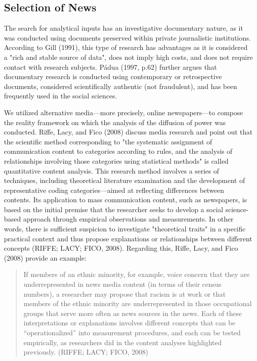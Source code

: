 \subsection{Selection of News}

The search for analytical inputs has an investigative documentary nature, as it was conducted using documents preserved within private journalistic institutions. According to Gill (1991), this type of research has advantages as it is considered a "rich and stable source of data", does not imply high costs, and does not require contact with research subjects. Pádua (1997, p.62) further argues that documentary research is conducted using contemporary or retrospective documents, considered scientifically authentic (not fraudulent), and has been frequently used in the social sciences.

We utilized alternative media—more precisely, online newspapers—to compose the reality framework on which the analysis of the diffusion of power was conducted. Riffe, Lacy, and Fico (2008) discuss media research and point out that the scientific method corresponding to "the systematic assignment of communication content to categories according to rules, and the analysis of relationships involving those categories using statistical methods" is called quantitative content analysis. This research method involves a series of techniques, including theoretical literature examination and the development of representative coding categories—aimed at reflecting differences between contents. Its application to mass communication content, such as newspapers, is based on the initial premise that the researcher seeks to develop a social science-based approach through empirical observations and measurements. In other words, there is sufficient suspicion to investigate "theoretical traits" in a specific practical context and thus propose explanations or relationships between different concepts (RIFFE; LACY; FICO, 2008). Regarding this, Riffe, Lacy, and Fico (2008) provide an example:

\begin{quote}
If members of an ethnic minority, for example, voice concern that they are underrepresented in news media content (in terms of their census numbers), a researcher may propose that racism is at work or that members of the ethnic minority are underrepresented in those occupational groups that serve more often as news sources in the news. Each of these interpretations or explanations involves different concepts that can be “operationalized” into measurement procedures, and each can be tested empirically, as researchers did in the content analyses highlighted previously. (RIFFE; LACY; FICO, 2008)
\end{quote}

